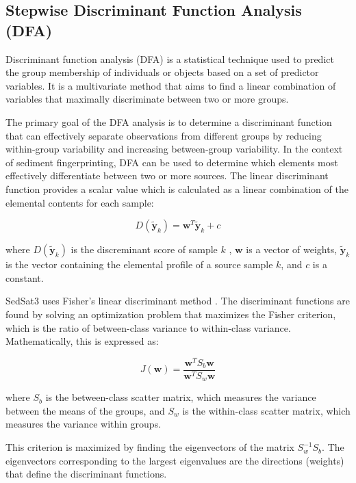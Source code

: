 \documentclass[12pt]{report}
\begin{document}
\subsection{Stepwise Discriminant Function Analysis (DFA)}
Discriminant function analysis (DFA) is a statistical technique used to predict the group membership of individuals or objects based on a set of predictor variables. It is a multivariate method that aims to find a linear combination of variables that maximally discriminate between two or more groups.

The primary goal of the DFA analysis is to determine a discriminant function that can effectively separate observations from different groups by reducing within-group variability and increasing between-group variability. In the context of sediment fingerprinting, DFA can be used to determine which elements most effectively differentiate between two or more sources. The linear discriminant function provides a scalar value which is calculated as a linear combination of the elemental contents for each sample: 


\begin{equation}\label{eq:discriminant_score}
    D(\tilde{\mathbf{y}}_k) = \mathbf{w}^T \tilde{\mathbf{y}}_k + c
\end{equation}

where $D(\tilde{\mathbf{y}}_k)$ is the discreminant score of sample $k$ , $\mathbf{w}$ is a vector of weights, $\tilde{\mathbf{y}}_k$ is the vector containing the elemental profile of a source sample $k$, and $c$ is a constant. 

SedSat3 uses Fisher's linear discriminant method \citep{fisher1936use}. The discriminant functions are found by solving an optimization problem that maximizes the Fisher criterion, which is the ratio of between-class variance to within-class variance. Mathematically, this is expressed as:

\begin{equation}
    J(\textbf{w}) = \frac{\textbf{w}^TS_b\textbf{w}}{\textbf{w}^TS_w\textbf{w}}
\end{equation}
    
where $S_b$ is the between-class scatter matrix, which measures the variance between the means of the groups, and $S_w$ is the within-class scatter matrix, which measures the variance within groups. 

This criterion is maximized by finding the eigenvectors of the matrix  $S_w^{-1} S_b$. The eigenvectors corresponding to the largest eigenvalues are the directions (weights) that define the discriminant functions.
\end{document}
